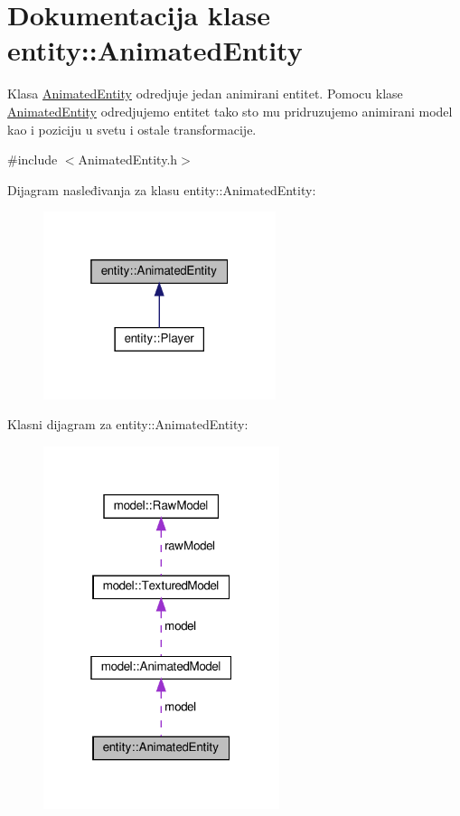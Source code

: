 \hypertarget{classentity_1_1AnimatedEntity}{}\section{Dokumentacija klase entity\+:\+:Animated\+Entity}
\label{classentity_1_1AnimatedEntity}


Klasa \hyperlink{classentity_1_1AnimatedEntity}{Animated\+Entity} odredjuje jedan animirani entitet. Pomocu klase \hyperlink{classentity_1_1AnimatedEntity}{Animated\+Entity} odredjujemo entitet tako sto mu pridruzujemo animirani model kao i poziciju u svetu i ostale transformacije.  




{\ttfamily \#include $<$Animated\+Entity.\+h$>$}



Dijagram nasleđivanja za klasu entity\+:\+:Animated\+Entity\+:
\nopagebreak
\begin{figure}[H]
\begin{center}
\leavevmode
\includegraphics[width=193pt]{classentity_1_1AnimatedEntity__inherit__graph}
\end{center}
\end{figure}


Klasni dijagram za entity\+:\+:Animated\+Entity\+:
\nopagebreak
\begin{figure}[H]
\begin{center}
\leavevmode
\includegraphics[width=196pt]{classentity_1_1AnimatedEntity__coll__graph}
\end{center}
\end{figure}
